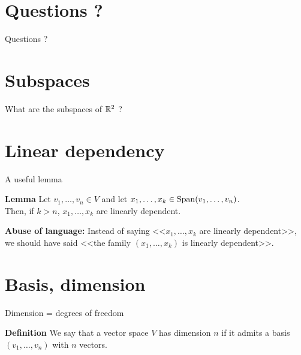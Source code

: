 \documentclass{beamer}
\begin{document}
\section{Questions ?}
\begin{frame}[t]{Questions ?}
	\pause
\end{frame}

\section{Subspaces}

\begin{frame}{What are the subspaces of $\mathbb{R}^2$ ?}
\end{frame}


\section{Linear dependency}
\begin{frame}[t]{A useful lemma}
	\vspace{-0.4cm}
	\begin{block}{\bf Lemma}
		Let $v_1, \dots, v_n \in V$
		and let $x_1, \dots, x_k \in {{\rm Span}}(v_1, \dots, v_n)$.
		\\
		Then, if $k > n$,
		$x_1, \dots, x_k$ are linearly dependent.
	\end{block}
	\textbf{Abuse of language:} Instead of saying <<$x_1, \dots, x_k$ are linearly dependent>>, we should have said <<the family $(x_1, \dots, x_k)$ is linearly dependent>>.
\end{frame}

\section{Basis, dimension}

\begin{frame}[t]{Dimension =  degrees of freedom}
	\begin{block}{\bf Definition}
		We say that a vector space $V$ has dimension $n$ if it admits a basis $(v_1, \dots, v_n)$ with $n$ vectors.
	\end{block}
\end{frame}
\end{document}
